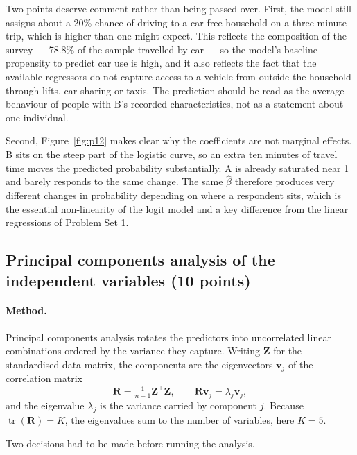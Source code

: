 \documentclass[11pt,a4paper]{article}
\begin{document}
Two points deserve comment rather than being passed over. First, the model still assigns
about a 20\% chance of driving to a car-free household on a three-minute trip, which is
higher than one might expect. This reflects the composition of the survey --- 78.8\% of the
sample travelled by car --- so the model's baseline propensity to predict car use is high,
and it also reflects the fact that the available regressors do not capture access to a
vehicle from outside the household through lifts, car-sharing or taxis. The prediction
should be read as the average behaviour of people with B's recorded characteristics, not
as a statement about one individual.

Second, Figure~\ref{fig:p12} makes clear why the coefficients are not marginal effects. B
sits on the steep part of the logistic curve, so an extra ten minutes of travel time moves
the predicted probability substantially. A is already saturated near 1 and barely responds
to the same change. The same $\hat\beta$ therefore produces very different changes in
probability depending on where a respondent sits, which is the essential non-linearity of
the logit model and a key difference from the linear regressions of Problem Set 1.

\subsection{Principal components analysis of the independent variables (10 points)}
\label{sec:pca}

\paragraph{Method.} Principal components analysis rotates the predictors into uncorrelated
linear combinations ordered by the variance they capture. Writing $\mathbf{Z}$ for the
standardised data matrix, the components are the eigenvectors $\mathbf{v}_j$ of the
correlation matrix
\begin{equation}
\mathbf{R} = \tfrac{1}{n-1}\mathbf{Z}^{\top}\mathbf{Z},
\qquad
\mathbf{R}\mathbf{v}_j = \lambda_j \mathbf{v}_j,
\label{eq:pca}
\end{equation}
and the eigenvalue $\lambda_j$ is the variance carried by component $j$. Because
$\operatorname{tr}(\mathbf{R}) = K$, the eigenvalues sum to the number of variables, here
$K=5$.

Two decisions had to be made before running the analysis.
\end{document}
